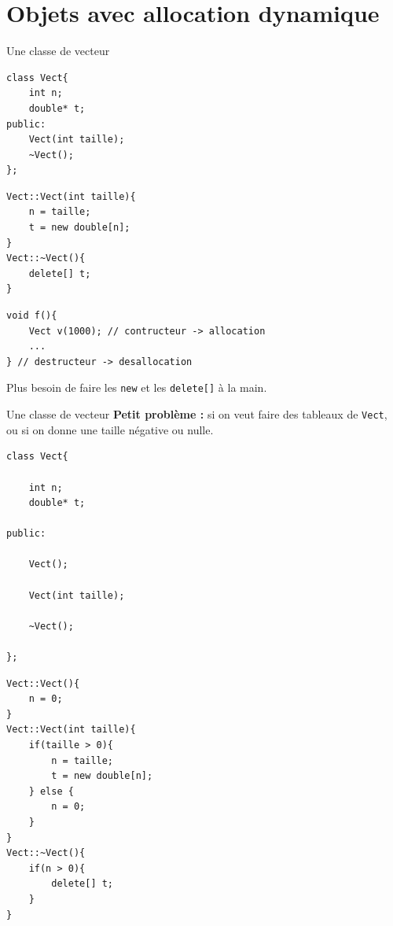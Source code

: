\section{Objets avec allocation dynamique}

\begin{frame}[fragile=singleslide]{Une classe de vecteur}
    \begin{minipage}{0.44\linewidth}
            \begin{verbatim}
class Vect{
    int n;
    double* t;
public:
    Vect(int taille);
    ~Vect();
};
            \end{verbatim}
    \end{minipage}
    \hfill
    \begin{minipage}{0.50\linewidth}
            \begin{verbatim}
Vect::Vect(int taille){
    n = taille;
    t = new double[n];
}
Vect::~Vect(){
    delete[] t;
}
            \end{verbatim}
    \end{minipage}
    
        \begin{verbatim}
void f(){
    Vect v(1000); // contructeur -> allocation
    ...
} // destructeur -> desallocation
        \end{verbatim}
    
Plus besoin de faire les \texttt{new} et les \texttt{delete[]} à la main.
\end{frame}

\begin{frame}[fragile=singleslide]{Une classe de vecteur}
    \textbf{Petit problème :} si on veut faire des tableaux de \texttt{Vect}, ou si on donne une taille négative ou nulle.

    \begin{minipage}{0.44\linewidth}
        
            \begin{verbatim}
class Vect{

    int n;
    double* t;

public:

    Vect();

    Vect(int taille);

    ~Vect();

};
            \end{verbatim}
        
    \end{minipage}
    \hfill
    \begin{minipage}{0.50\linewidth}
        
            \begin{verbatim}
Vect::Vect(){
    n = 0;
}
Vect::Vect(int taille){
    if(taille > 0){
        n = taille;
        t = new double[n];
    } else {
        n = 0;
    }
}
Vect::~Vect(){
    if(n > 0){
        delete[] t;
    }
}
            \end{verbatim}
        
    \end{minipage}
\end{frame}


